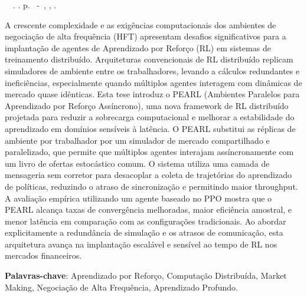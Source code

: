 \setlength{\absparsep}{18pt} %
\begin{resumo}
	\begin{flushleft} 
			\setlength{\absparsep}{0pt} %
			\SingleSpacing 
			\imprimirautorabr~~\textbf{\imprimirtituloresumo}.	\imprimirdata. \pageref{LastPage} p. 
			\imprimirtipotrabalho~-~\imprimirinstituicao, \imprimirlocal, \imprimirdata. 
 	\end{flushleft}
\OnehalfSpacing 			
    A crescente complexidade e as exigências computacionais dos ambientes de negociação de alta frequência (HFT) apresentam desafios significativos para
    a implantação de agentes de Aprendizado por Reforço (RL) em sistemas de treinamento distribuído.
    Arquiteturas convencionais de RL distribuído replicam simuladores de ambiente entre os trabalhadores,
    levando a cálculos redundantes e ineficiências, especialmente quando múltiplos agentes interagem com dinâmicas de mercado quase idênticas.
    Esta tese introduz o PEARL (Ambientes Paralelos para Aprendizado por Reforço Assíncrono),
    uma nova framework de RL distribuído projetada para reduzir a sobrecarga computacional e melhorar a estabilidade do aprendizado em domínios sensíveis à latência.
    O PEARL substitui as réplicas de ambiente por trabalhador por um simulador de mercado compartilhado e paralelizado, que permite
    que múltiplos agentes interajam assíncronamente com um livro de ofertas estocástico comum.
    O sistema utiliza uma camada de mensageria sem corretor para desacoplar a coleta de trajetórias do aprendizado de políticas,
    reduzindo o atraso de sincronização e permitindo maior throughput.
    A avaliação empírica utilizando um agente baseado no PPO mostra que o PEARL alcança taxas de convergência melhoradas, maior eficiência amostral,
    e menor latência em comparação com as configurações tradicionais.
    Ao abordar explicitamente a redundância de simulação e os atrasos de comunicação,
    esta arquitetura avança na implantação escalável e sensível ao tempo de RL nos mercados financeiros.

 \textbf{Palavras-chave}: Aprendizado por Reforço, Computação Distribuída, Market Making, Negociação de Alta Frequência, Aprendizado Profundo.
\end{resumo}